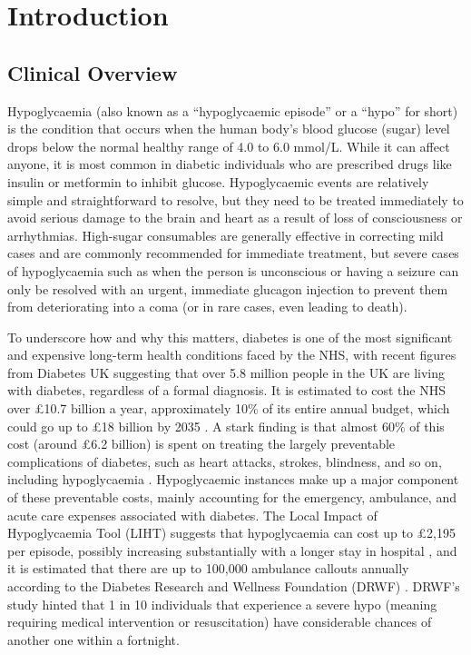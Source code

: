 \section{Introduction}

\begin{flushleft}
\end{flushleft}

\subsection{Clinical Overview}
\par{ \noindent Hypoglycaemia (also known as a “hypoglycaemic episode” or a “hypo” for short) is the condition that occurs when the human body’s blood glucose (sugar) level drops below the normal healthy range of 4.0 to 6.0 mmol/L. While it can affect anyone, it is most common in diabetic individuals who are prescribed drugs like insulin or metformin to inhibit glucose. Hypoglycaemic events are relatively simple and straightforward to resolve, but they need to be treated immediately to avoid serious damage to the brain and heart as a result of loss of consciousness or arrhythmias. High-sugar consumables are generally effective in correcting mild cases and are commonly recommended for immediate treatment, but severe cases of hypoglycaemia such as when the person is unconscious or having a seizure can only be resolved with an urgent, immediate glucagon injection to prevent them from deteriorating into a coma (or in rare cases, even leading to death). }


\vspace{10pt}
\par{\noindent To underscore how and why this matters, diabetes is one of the most significant and expensive long-term health conditions faced by the NHS, with recent figures from Diabetes UK suggesting that over 5.8 million people in the UK are living with diabetes, regardless of a formal diagnosis. It is estimated to cost the NHS over £10.7 billion a year, approximately 10\% of its entire annual budget, which could go up to £18 billion by 2035  \cite{diabetescosts}. A stark finding is that almost 60\% of this cost (around £6.2 billion) is spent on treating the largely preventable complications of diabetes, such as heart attacks, strokes, blindness, and so on, including hypoglycaemia  \cite{preventablediabetescosts}. Hypoglycaemic instances make up a major component of these preventable costs, mainly accounting for the emergency, ambulance, and acute care expenses associated with diabetes. The Local Impact of Hypoglycaemia Tool (LIHT) suggests that hypoglycaemia can cost up to £2,195 per episode, possibly increasing substantially with a longer stay in hospital  \cite{lihttool}, and it is estimated that there are up to 100,000 ambulance callouts annually according to the Diabetes Research and Wellness Foundation (DRWF)  \cite{diabetesemergencycallouts}. DRWF’s study hinted that 1 in 10 individuals that experience a severe hypo (meaning requiring medical intervention or resuscitation) have considerable chances of another one within a fortnight.}

